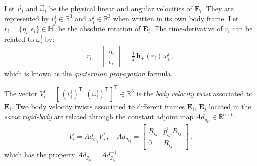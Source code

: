 Let $\vec{v}_{i}$ and $\vec{\omega}_{i}$ be the physical linear and angular velocities of $\mathbf{E}_{i}$. They are represented by 
$v^{i}_{i}\in\mathbb{R}^{3}$ and $\omega^{i}_{i}\in\mathbb{R}^{3}$ when written in its own body frame.
%
Let $r_i = \{\eta_i,\epsilon_i\}\in\mathbb{H}^*$ be the absolute rotation of $\mathbf{E}_i$. 
The time-derivative of $r_i$ can be related to $\omega^i_{i}$ by:
%
\begin{align}
\dot{\overline{r}}_i = 
%
\left[ \begin{array}{cc}
\dot{\eta}_i \\
\dot{\epsilon}_i 
\end{array} \right] = 
%
\frac{1}{2} \, \mathbf{h}_+(r_i) \, \omega^i_{i} \,, 
\label{eq:quaternion_propagation}
\end{align}
%
which is known as the \textit{quaternion propagation} formula.

The vector $V^{i}_{i} = [\, (v^{i}_{i})^\mathsf{T} \,\,\, (\omega^{i}_{i})^\mathsf{T} \,]^\mathsf{T} \in \mathbb{R}^{6}$ is the \textit{body velocity twist} associated to $\mathbf{E}_{i}$.
%
Two body velocity twists associated to different frames $\mathbf{E}_i$, $\mathbf{E}_j$ located in the \textit{same rigid-body} are related through the constant adjoint map 
$Ad_{g_{ij}} \in \mathbb{R}^{6 \times 6}$:
%
\begin{equation}
V^{i}_{i} = Ad_{g_{ij}} V^{j}_{j} \,, \quad
%
Ad_{g_{ij}} =
\left[\begin{array}{cc}
R_{ij} & \hat{p}^{i}_{ij} \, R_{ij} \\
  0    &             R_{ij}
\end{array}\right] \,.
\label{eq:adjoint_map}
\end{equation}
%
which has the property $Ad_{g_{ji}} = Ad^{-1}_{g_{ij}}$.

